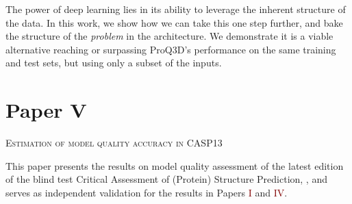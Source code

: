 \noindent
The power of deep learning lies in its ability to leverage the inherent structure of the data.
In this work, we show how we can take this one step further, and bake the structure of the \emph{problem} in the architecture.
We demonstrate it is a viable alternative reaching or surpassing ProQ3D's performance on the same training and test sets, but using only a subset of the inputs.

\section*{Paper V}
\begin{center}
	\textsc{Estimation of model quality accuracy in CASP13}
\end{center}

\noindent
This paper presents the results on model quality assessment of the latest edition of the blind test Critical Assessment of (Protein) Structure Prediction, ,
and serves as independent validation for the results in Papers \textcolor{Maroon}{I} and \textcolor{Maroon}{IV}.
